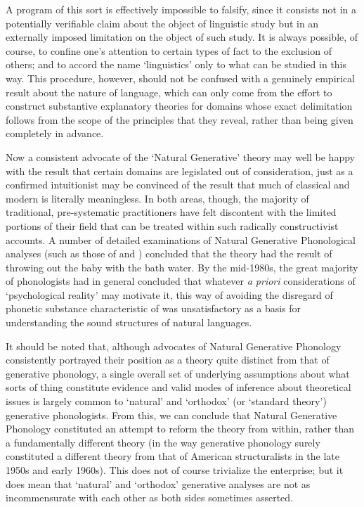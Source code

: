 A program of this sort is effectively impossible to falsify, since it
consists not in a potentially verifiable claim about the object of
linguistic study but in an externally imposed limitation on the object
of such study. It is always possible, of course, to confine one's
attention to certain types of fact to the exclusion of others; and to
accord the name `linguistics' only to what can be studied in this
way. This procedure, however, should not be confused with a genuinely
empirical result about the nature of language, which can only come
from the effort to construct substantive explanatory theories for
domains whose exact delimitation follows from the scope of the
principles that they reveal, rather than being given completely in
advance.

Now a consistent advocate of the `Natural Generative' theory may well
be happy with the result that certain domains are legislated out of
consideration, just as a confirmed intuitionist may be convinced of
the result that much of classical and modern  is literally
meaningless. In both areas, though, the majority of traditional,
pre-systematic practitioners have felt discontent with the limited
portions of their field that can be treated within such radically
constructivist accounts. A number of detailed examinations of Natural
Generative Phonological analyses (such as those of
\citet{harris78:morphophonology} and \citet{gussmann:abstract})
concluded that the theory had the result of throwing out the baby with
the bath water. By the mid-1980s, the great majority of phonologists
had in general concluded that whatever \textit{a priori}
considerations of `psychological reality' may motivate it, this way of
avoiding the disregard of phonetic substance characteristic of
\textsl{} was unsatisfactory as a basis for understanding the sound
structures of natural languages.

It should be noted that, although advocates of Natural Generative
Phonology consistently portrayed their position as a theory quite
distinct from that of generative phonology, a single overall set of
underlying assumptions about what sorts of thing constitute evidence
and valid modes of inference about theoretical issues is largely
common to `natural' and `orthodox' (or `standard theory') generative
phonologists. From this, we can conclude that Natural Generative
Phonology constituted an attempt to reform the theory from within,
rather than a fundamentally different theory (in the way generative
phonology surely constituted a different theory from that of American
structuralists in the late 1950s and early 1960s). This does not
of course trivialize the enterprise; but it does mean that `natural'
and `orthodox' generative analyses are not as incommensurate with each
other as both sides sometimes asserted.

